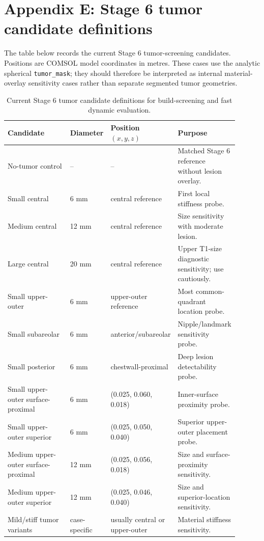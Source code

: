 \section*{Appendix E: Stage 6 tumor candidate definitions}
\label{sec:appendix_stage6_tumor_candidates}

The table below records the current Stage 6 tumor-screening candidates. Positions are COMSOL model coordinates in metres. These cases use the analytic spherical \texttt{tumor\_mask}; they should therefore be interpreted as internal material-overlay sensitivity cases rather than separate segmented tumor geometries.

\begin{table}[H]
\centering
\small
\caption{Current Stage 6 tumor candidate definitions for build-screening and fast dynamic evaluation.}
\label{tab:appendix_stage6_tumor_candidates}
\begin{tabular}{p{0.28\linewidth} p{0.15\linewidth} p{0.22\linewidth} p{0.25\linewidth}}
\toprule
Candidate & Diameter & Position $(x,y,z)$ & Purpose \\
\midrule
No-tumor control & -- & -- & Matched Stage 6 reference without lesion overlay. \\
Small central & 6 mm & central reference & First local stiffness probe. \\
Medium central & 12 mm & central reference & Size sensitivity with moderate lesion. \\
Large central & 20 mm & central reference & Upper T1-size diagnostic sensitivity; use cautiously. \\
Small upper-outer & 6 mm & upper-outer reference & Most common-quadrant location probe. \\
Small subareolar & 6 mm & anterior/subareolar & Nipple/landmark sensitivity probe. \\
Small posterior & 6 mm & chestwall-proximal & Deep lesion detectability probe. \\
Small upper-outer surface-proximal & 6 mm & (0.025, 0.060, 0.018) & Inner-surface proximity probe. \\
Small upper-outer superior & 6 mm & (0.025, 0.050, 0.040) & Superior upper-outer placement probe. \\
Medium upper-outer surface-proximal & 12 mm & (0.025, 0.056, 0.018) & Size and surface-proximity sensitivity. \\
Medium upper-outer superior & 12 mm & (0.025, 0.046, 0.040) & Size and superior-location sensitivity. \\
Mild/stiff tumor variants & case-specific & usually central or upper-outer & Material stiffness sensitivity. \\
\bottomrule
\end{tabular}
\end{table}

